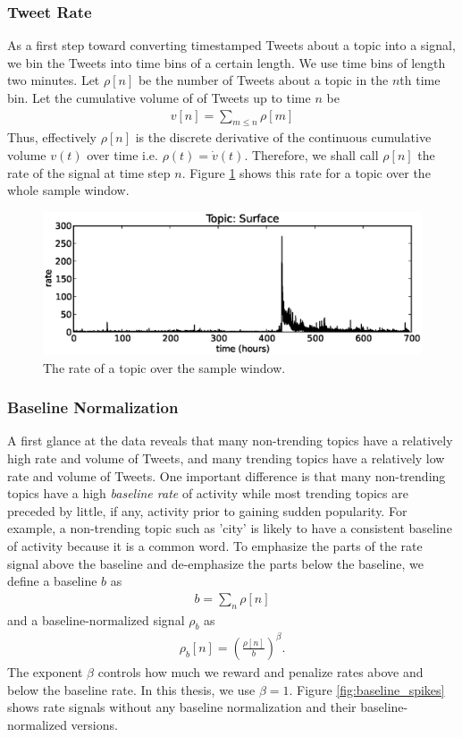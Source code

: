 \subsubsection{Tweet Rate}
As a first step toward converting timestamped Tweets about a topic into a
signal, we bin the Tweets into time bins of a certain length. We use time bins
of length two minutes. Let $\rho[n]$ be the number of Tweets about a topic in
the $n$th time bin. Let the cumulative volume of of Tweets up to time $n$ be
\begin{gather}
v[n] = \sum_{m \leq n} \rho[m]
\end{gather}
Thus, effectively $\rho[n]$ is the discrete derivative of the continuous
cumulative volume $v(t)$ over time i.e. $\rho(t) = \dot{v}(t)$. Therefore, we
shall call $\rho[n]$ the rate of the signal at time step $n$. Figure
\ref{fig:rate} shows this rate for a topic over the whole sample window.
\begin{figure}[h!]
\begin{center}
\includegraphics[width=6in]{../fig/final/signal_transform/rate.eps}
\end{center}
\caption{\label{fig:rate} The rate of a topic over the sample window.}
\end{figure}

\subsubsection{Baseline Normalization}
A first glance at the data reveals that many non-trending topics have a
relatively high rate and volume of Tweets, and many trending topics have a
relatively low rate and volume of Tweets. One important difference is that many
non-trending topics have a high {\em baseline rate} of activity while most
trending topics are preceded by little, if any, activity prior to gaining sudden
popularity. For example, a non-trending topic such as 'city' is likely to have a
consistent baseline of activity because it is a common word. To emphasize the
parts of the rate signal above the baseline and de-emphasize the parts below the
baseline, we define a baseline $b$ as 
\begin{gather}
b = \sum_{n} \rho[n]
\end{gather}
and a baseline-normalized signal $\rho_{b}$ as
\begin{gather}
\rho_{b}[n] = \left(\frac{\rho[n]}{b}\right)^{\beta}.
\end{gather}
The exponent $\beta$ controls how much we reward and penalize rates above and
below the baseline rate. In this thesis, we use $\beta = 1$. Figure
\ref{fig:baseline_spikes} shows rate signals without any baseline normalization
and their baseline-normalized versions.


